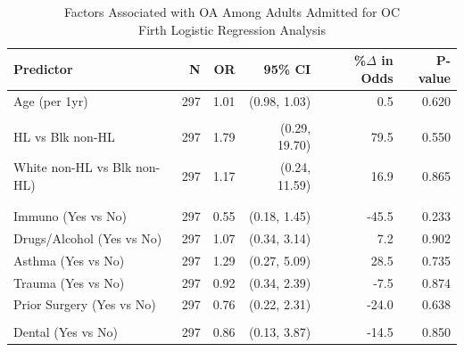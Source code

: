 \documentclass[
]{article}
\begin{document}
\begin{table}[t]
\caption*{
{\fontsize{20}{25}\selectfont  Factors Associated with OA Among Adults Admitted for OC\small } \\ 
{\fontsize{14}{17}\selectfont  Firth Logistic Regression Analysis\small }
} 
\begin{tabular*}{0.85\linewidth}{@{\extracolsep{\fill}}lrrrrr}
\toprule
{\bfseries Predictor} & N & OR & 95\% CI & \%\ensuremath{\Delta} in Odds & P-value \\ 
\midrule\addlinespace[2.5pt]
Age (per 1yr) & 297 & 1.01 & (0.98, 1.03) & 0.5 & 0.620 \\ 
{\cellcolor[HTML]{FFF3CD}{Sex (Male vs Female)}} & {\cellcolor[HTML]{FFF3CD}{297}} & {\cellcolor[HTML]{FFF3CD}{0.43}} & {\cellcolor[HTML]{FFF3CD}{(0.20, 0.90)}} & {\cellcolor[HTML]{FFF3CD}{-57.3}} & {\cellcolor[HTML]{FFF3CD}{0.025}} \\ 
HL vs Blk non-HL & 297 & 1.79 & (0.29, 19.70) & 79.5 & 0.550 \\ 
White non-HL vs Blk non-HL) & 297 & 1.17 & (0.24, 11.59) & 16.9 & 0.865 \\ 
{\cellcolor[HTML]{FFF3CD}{Sinusitis (Yes vs No)}} & {\cellcolor[HTML]{FFF3CD}{297}} & {\cellcolor[HTML]{FFF3CD}{0.34}} & {\cellcolor[HTML]{FFF3CD}{(0.14, 0.74)}} & {\cellcolor[HTML]{FFF3CD}{-66.4}} & {\cellcolor[HTML]{FFF3CD}{0.006}} \\ 
{\cellcolor[HTML]{FFF3CD}{Diabetes (Yes vs No)}} & {\cellcolor[HTML]{FFF3CD}{297}} & {\cellcolor[HTML]{FFF3CD}{0.33}} & {\cellcolor[HTML]{FFF3CD}{(0.10, 0.92)}} & {\cellcolor[HTML]{FFF3CD}{-66.8}} & {\cellcolor[HTML]{FFF3CD}{0.034}} \\ 
Immuno (Yes vs No) & 297 & 0.55 & (0.18, 1.45) & -45.5 & 0.233 \\ 
Drugs/Alcohol (Yes vs No) & 297 & 1.07 & (0.34, 3.14) & 7.2 & 0.902 \\ 
Asthma (Yes vs No) & 297 & 1.29 & (0.27, 5.09) & 28.5 & 0.735 \\ 
Trauma (Yes vs No) & 297 & 0.92 & (0.34, 2.39) & -7.5 & 0.874 \\ 
Prior Surgery (Yes vs No) & 297 & 0.76 & (0.22, 2.31) & -24.0 & 0.638 \\ 
{\cellcolor[HTML]{FFF3CD}{Surgery in Admission (Yes vs No)}} & {\cellcolor[HTML]{FFF3CD}{297}} & {\cellcolor[HTML]{FFF3CD}{5.73}} & {\cellcolor[HTML]{FFF3CD}{(2.69, 13.17)}} & {\cellcolor[HTML]{FFF3CD}{472.6}} & {\cellcolor[HTML]{FFF3CD}{<0.001}} \\ 
Dental (Yes vs No) & 297 & 0.86 & (0.13, 3.87) & -14.5 & 0.850 \\ 

\end{tabular*}
\end{table}
\end{document}
